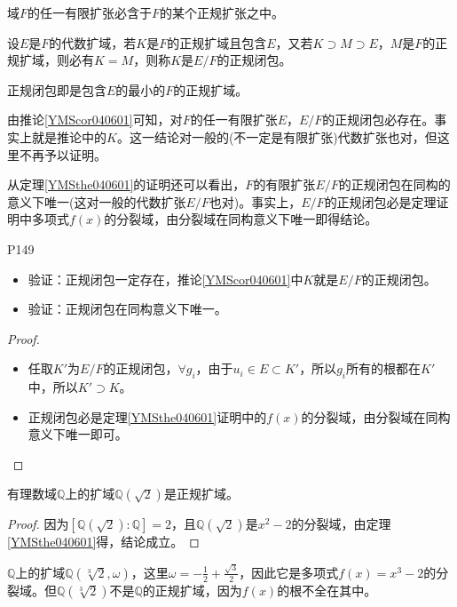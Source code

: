 \begin{corollary}\label{YMScor040601}
	域$F$的任一有限扩张必含于$F$的某个正规扩张之中。
\end{corollary}

\begin{definition}
	设$E$是$F$的代数扩域，若$K$是$F$的正规扩域且包含$E$，又若$K\supset M\supset E $，$M$是$F$的正规扩域，则必有$K=M$，则称$K$是$E/F$的正规闭包。
\end{definition}

\original
{
	正规闭包即是包含$E$的最小的$F$的正规扩域。
	\par
	由推论\ref{YMScor040601}可知，对$F$的任一有限扩张$E$，$E/F$的正规闭包必存在。事实上就是推论中的$K$。这一结论对一般的(不一定是有限扩张)代数扩张也对，但这里不再予以证明。
	\par
	从定理\ref{YMSthe040601}的证明还可以看出，$F$的有限扩张$E/F$的正规闭包在同构的意义下唯一(这对一般的代数扩张$E/F$也对)。事实上，$E/F$的正规闭包必是定理证明中多项式$f(x)$的分裂域，由分裂域在同构意义下唯一即得结论。
}
{P149}
\begin{proposition}
	\begin{itemize}
		\item 验证：正规闭包一定存在，推论\ref{YMScor040601}中$K$就是$E/F$的正规闭包。
		\item 验证：正规闭包在同构意义下唯一。
	\end{itemize}
\end{proposition}

\begin{proof}
	\begin{itemize}
		\item 任取$K'$为$E/F$的正规闭包，$\forall g_{i}$，由于$u_{i}\in E\subset  K'$，所以$g_{i}$所有的根都在$K'$中，所以$K'\supset K$。
		\item 正规闭包必是定理\ref{YMSthe040601}证明中的$f(x)$的分裂域，由分裂域在同构意义下唯一即可。
	\end{itemize}
\end{proof}


\begin{example}
	有理数域$\mathbb{Q}$上的扩域$\mathbb{Q}(\sqrt{2})$是正规扩域。
\end{example}
\begin{proof}
	因为$[\mathbb{Q}(\sqrt{2}):\mathbb{Q}]=2$，且$\mathbb{Q}(\sqrt{2})$是$x^{2}-2$的分裂域，由定理\ref{YMSthe040601}得，结论成立。
\end{proof}

\begin{example}
	$\mathbb{Q}$上的扩域$\mathbb{Q}(\sqrt[3]{2},\omega)$，这里$\omega=-\frac{1}{2}+\frac{\sqrt{3}}{2}$，因此它是多项式$f(x)=x^{3}-2$的分裂域。但$\mathbb{Q}(\sqrt[3]{2})$不是$\mathbb{Q}$的正规扩域，因为$f(x)$的根不全在其中。
\end{example}

